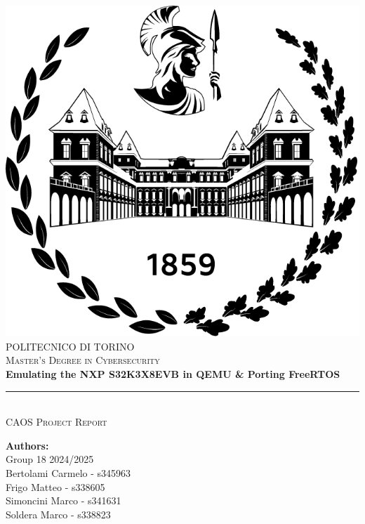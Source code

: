 \documentclass[11pt]{article}
\title{\ctitle}
\author{} %
\date{February 18, 2025}
\newcommand{\ctitle}{Emulating the NXP S32K3X8EVB in QEMU \& Porting FreeRTOS}
\begin{document}
\begin{titlepage}
    \centering
    \includegraphics[scale=0.4]{logoPoli.png}\\[1.0 cm]
    \textsc{\LARGE POLITECNICO DI TORINO}\\[0.2 cm]
    \textsc{\large Master’s Degree in Cybersecurity}\\[4 cm]
    {\huge \bfseries \ctitle}\\[0.2 cm]
    \rule{0.6\linewidth}{0.25 mm}\\[0.3 cm]
    \textsc{\Large CAOS Project Report}\\[0.7 cm]

    \vspace{2cm} %

    \begin{flushleft} \large
        \textbf{Authors:}\\[0.1cm]
        Group 18 2024/2025\\[0.1cm]
        Bertolami Carmelo - s345963\\[0.1cm]
        Frigo Matteo - s338605\\[0.1cm]
        Simoncini Marco - s341631\\[0.1cm]
        Soldera Marco - s338823
    \end{flushleft}

    \vfill
\end{titlepage}
\end{document}
